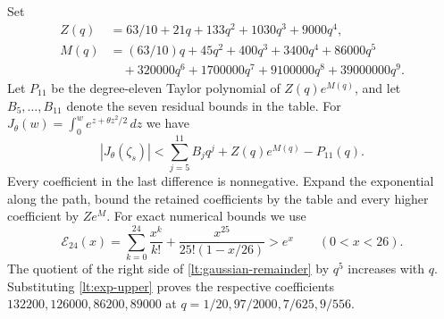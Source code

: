 \documentclass[11pt,reqno]{amsart}
\numberwithin{equation}{section}
\theoremstyle{definition}
\theoremstyle{remark}
\begin{document}
Set
\begin{align*}
 Z(q)&=63/10+21q+133q^2+1030q^3+9000q^4,\\
 M(q)&=(63/10)q+45q^2+400q^3+3400q^4+86000q^5\\
     &\quad+320000q^6+1700000q^7+9100000q^8+39000000q^9.
\end{align*}
Let $P_{11}$ be the degree-eleven Taylor polynomial of $Z(q)e^{M(q)}$,
and let $B_5,\ldots,B_{11}$ denote the seven residual bounds in the
table. For $J_\theta(w)=\int_0^we^{z+\theta z^2/2}\,dz$ we have
\begin{equation}\label{lt:gaussian-remainder}
 |J_\theta(\zeta_s)|
 <\sum_{j=5}^{11}B_jq^j+Z(q)e^{M(q)}-P_{11}(q).
\end{equation}
Every coefficient in the last difference is nonnegative. Expand the
exponential along the path, bound the retained coefficients by the table
and every higher coefficient by $Z e^M$.
For exact numerical bounds we use
\begin{equation}\label{lt:exp-upper}
 \mathcal E_{24}(x)=\sum_{k=0}^{24}\frac{x^k}{k!}
       +\frac{x^{25}}{25!(1-x/26)}>e^x\qquad(0<x<26).
\end{equation}
The quotient of the right side of \eqref{lt:gaussian-remainder} by
$q^5$ increases with $q$. Substituting \eqref{lt:exp-upper} proves
the respective coefficients $132200,126000,86200,89000$ at
$q=1/20,97/2000,7/625,9/556$.
\end{document}
